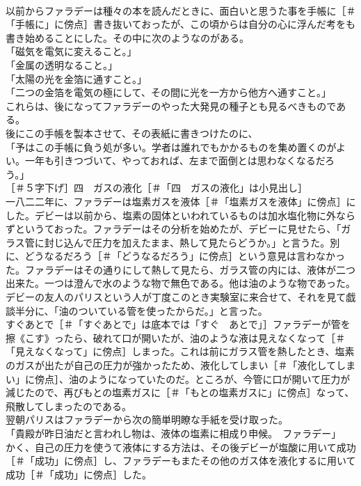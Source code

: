 \documentclass[8pt]{extreport}
\begin{document}
\begin{CJK}{UTF8}{min}
\\	以前からファラデーは種々の本を読んだときに、面白いと思うた事を手帳に［＃「手帳に」に傍点］書き抜いておったが、この頃からは自分の心に浮んだ考をも書き始めることにした。その中に次のようなのがある。
\\	「磁気を電気に変えること。」
\\	「金属の透明なること。」
\\	「太陽の光を金箔に通すこと。」
\\	「二つの金箔を電気の極にして、その間に光を一方から他方へ通すこと。」
\\	これらは、後になってファラデーのやった大発見の種子とも見るべきものである。
\\	後にこの手帳を製本させて、その表紙に書きつけたのに、
\\	「予はこの手帳に負う処が多い。学者は誰れでもかかるものを集め置くのがよい。一年も引きつづいて、やっておれば、左まで面倒とは思わなくなるだろう。」
\\	［＃５字下げ］四　ガスの液化［＃「四　ガスの液化」は小見出し］
\\	一八二二年に、ファラデーは塩素ガスを液体［＃「塩素ガスを液体」に傍点］にした。デビーは以前から、塩素の固体といわれているものは加水塩化物に外ならずというておった。ファラデーはその分析を始めたが、デビーに見せたら、「ガラス管に封じ込んで圧力を加えたまま、熱して見たらどうか。」と言うた。別に、どうなるだろう［＃「どうなるだろう」に傍点］という意見は言わなかった。ファラデーはその通りにして熱して見たら、ガラス管の内には、液体が二つ出来た。一つは澄んで水のような物で無色である。他は油のような物であった。デビーの友人のパリスという人が丁度このとき実験室に来合せて、それを見て戯談半分に、「油のついている管を使ったからだ。」と言った。
\\	すぐあとで［＃「すぐあとで」は底本では「すぐ　あとで」］ファラデーが管を擦《こす》ったら、破れて口が開いたが、油のような液は見えなくなって［＃「見えなくなって」に傍点］しまった。これは前にガラス管を熱したとき、塩素のガスが出たが自己の圧力が強かったため、液化してしまい［＃「液化してしまい」に傍点］、油のようになっていたのだ。ところが、今管に口が開いて圧力が減じたので、再びもとの塩素ガスに［＃「もとの塩素ガスに」に傍点］なって、飛散してしまったのである。
\\	翌朝パリスはファラデーから次の簡単明瞭な手紙を受け取った。
\\	「貴殿が昨日油だと言われし物は、液体の塩素に相成り申候。　ファラデー」
\\	かく、自己の圧力を使うて液体にする方法は、その後デビーが塩酸に用いて成功［＃「成功」に傍点］し、ファラデーもまたその他のガス体を液化するに用いて成功［＃「成功」に傍点］した。

\end{CJK}
\end{document}
